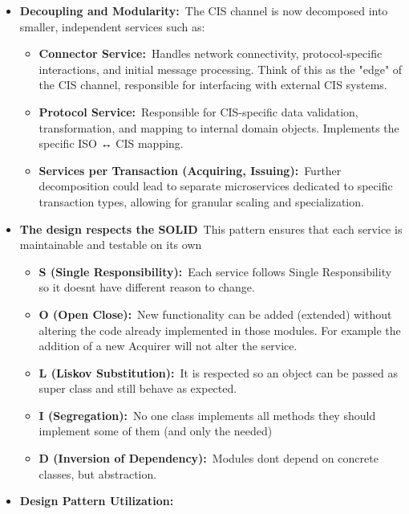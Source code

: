 \documentclass[12pt,a4paper]{report}
\begin{document}
\begin{itemize}
\item
  \textbf{Decoupling and Modularity:}~The CIS channel is now decomposed
  into smaller, independent services such as:

  \begin{itemize}
  \item
    \textbf{Connector Service:}~Handles network connectivity,
    protocol-specific interactions, and initial message processing.
    Think of this as the "edge" of the CIS channel, responsible for
    interfacing with external CIS systems.
  \item
    \textbf{Protocol Service:}~Responsible for CIS-specific data
    validation, transformation, and mapping to internal domain objects.
    Implements the specific ISO ↔ CIS mapping.
  \item
    \textbf{Services per Transaction (Acquiring, Issuing):}~Further
    decomposition could lead to separate microservices dedicated to
    specific transaction types, allowing for granular scaling and
    specialization.
  \end{itemize}
\item
  \textbf{The design respects the SOLID}~This pattern ensures that each
  service is maintainable and testable on its own

  \begin{itemize}
  \item
    \textbf{S (Single Responsibility):}~Each service follows Single
    Responsibility so it doesn\textquotesingle t have different reason
    to change.
  \item
    \textbf{O (Open Close):}~New functionality can be added (extended)
    without altering the code already implemented in those modules. For
    example the addition of a new Acquirer will not alter the service.
  \item
    \textbf{L (Liskov Substitution):}~It is respected so an object can
    be passed as super class and still behave as expected.
  \item
    \textbf{I (Segregation):}~No one class implements all methods they
    should implement some of them (and only the needed)
  \item
    \textbf{D (Inversion of Dependency):}~Modules don\textquotesingle t
    depend on concrete classes, but abstraction.
  \end{itemize}
\item
  \textbf{Design Pattern Utilization:}


\end{itemize}
\end{document}
